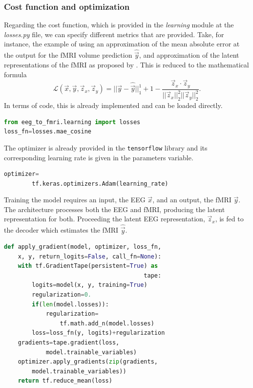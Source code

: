 \subsubsection{Cost function and optimization}

Regarding the cost function, which is provided in the \textit{learning} module at the \textit{losses.py} file, we can specify different metrics that are provided. Take, for instance, the example of using an approximation of the mean absolute error at the output for the fMRI volume prediction $\hat{\vec{y}}$, and approximation of the latent representations of the fMRI as proposed by \cite{calhas2022eeg}. This is reduced to the mathematical formula
\begin{equation}\label{equation:loss}
    \mathcal{L}(\vec{x}, \vec{y}, \vec{z}_x, \vec{z}_y) = ||\vec{y} - \hat{\vec{y}}||_1^1 + 1 - \frac{\vec{z}_x \cdot \vec{z}_y}{||\vec{z}_x||_2^2 ||\vec{z}_y||_2^2}.
\end{equation}
In terms of code, this is already implemented and can be loaded directly.
\begin{lstlisting}[language=python]
from eeg_to_fmri.learning import losses
loss_fn=losses.mae_cosine
\end{lstlisting}
The optimizer is already provided in the \texttt{tensorflow} library and its corresponding learning rate is given in the parameters variable.
\begin{lstlisting}[language=python]
optimizer=
        tf.keras.optimizers.Adam(learning_rate)
\end{lstlisting}
Training the model requires an input, the EEG $\vec{x}$, and an output, the fMRI $\vec{y}$. The architecture processes both the EEG and fMRI, producing the latent representation for both. Proceeding the latent EEG representation, $\vec{z}_x$, is fed to the decoder which estimates the fMRI $\hat{\vec{y}}$.
\begin{lstlisting}[language=python]
def apply_gradient(model, optimizer, loss_fn,
    x, y, return_logits=False, call_fn=None):
    with tf.GradientTape(persistent=True) as
                                        tape:
        logits=model(x, y, training=True)
        regularization=0.
        if(len(model.losses)):
            regularization=
                tf.math.add_n(model.losses)
        loss=loss_fn(y, logits)+regularization
    gradients=tape.gradient(loss,
            model.trainable_variables)
    optimizer.apply_gradients(zip(gradients,
        model.trainable_variables))
    return tf.reduce_mean(loss)
\end{lstlisting}
